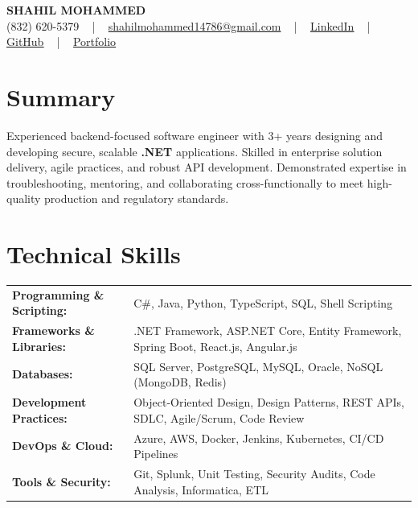 \documentclass[letterpaper,11pt]{article}
\begin{document}
\begin{center}
    {\fontsize{14pt}{12pt}\selectfont \textbf{\MakeUppercase{Shahil Mohammed}}}\\ \vspace{2pt}
    \fontsize{10pt}{12pt}\selectfont (832) 620-5379 ~ | ~ \href{mailto:shahilmohammed14786@gmail.com}{shahilmohammed14786@gmail.com} ~ | ~  
    \href{https://www.linkedin.com/in/shahil-mohammed-9652931a1/}{\color{blue}\underline{LinkedIn}}  ~ | ~ 
    \href{https://github.com/freakbeast14}{\color{blue}\underline{GitHub}} ~ | ~ 
    \href{https://shahil-mohammed.netlify.app/}{\color{blue}\underline{Portfolio}}
    \vspace{-8pt}
\end{center}

\section{Summary}
\fontsize{9pt}{10pt}\selectfont
Experienced backend-focused software engineer with 3+ years designing and developing secure, scalable \textbf{.NET} applications. Skilled in enterprise solution delivery, agile practices, and robust API development. Demonstrated expertise in troubleshooting, mentoring, and collaborating cross-functionally to meet high-quality production and regulatory standards.

 \vspace{-5pt}
 
\section{Technical Skills}
        \vspace{-14pt}
        \begin{table}[h]
            \fontsize{9pt}{10pt}\selectfont
            \begin{tabular}{p{0.3\linewidth} p{0.7\linewidth}}
                \textbf{Programming \& Scripting:} & C\#, Java, Python, TypeScript, SQL, Shell Scripting \\
                \textbf{Frameworks \& Libraries:} & .NET Framework, ASP.NET Core, Entity Framework, Spring Boot, React.js, Angular.js \\
                \textbf{Databases:} & SQL Server, PostgreSQL, MySQL, Oracle, NoSQL (MongoDB, Redis) \\
                \textbf{Development Practices:} & Object-Oriented Design, Design Patterns, REST APIs, SDLC, Agile/Scrum, Code Review \\
                \textbf{DevOps \& Cloud:} & Azure, AWS, Docker, Jenkins, Kubernetes, CI/CD Pipelines \\
                \textbf{Tools \& Security:} & Git, Splunk, Unit Testing, Security Audits, Code Analysis, Informatica, ETL \\
            \end{tabular}
        \end{table}
 \vspace{-15pt}
 
\end{document}
